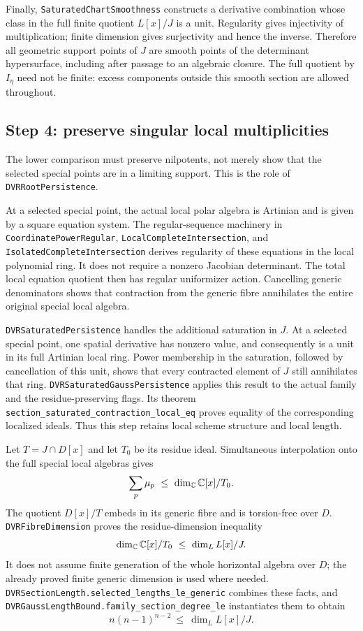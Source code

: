 Finally, \nolinkurl{SaturatedChartSmoothness} constructs a derivative
combination whose class in the full finite quotient $L[x]/J$ is a unit.
Regularity gives injectivity of multiplication; finite dimension gives
surjectivity and hence the inverse.  Therefore all geometric support
points of $J$ are smooth points of the determinant hypersurface, including
after passage to an algebraic closure.  The full quotient by $I_\eta$
need not be finite: excess components outside this smooth section are
allowed throughout.

\subsection{Step 4: preserve singular local multiplicities}
\label{app:lean-persistence}

The lower comparison must preserve nilpotents, not merely show that the
selected special points are in a limiting support.  This is the role of
\nolinkurl{DVRRootPersistence}.

At a selected special point, the actual local polar algebra is Artinian
and is given by a square equation system.  The regular-sequence machinery
in \nolinkurl{CoordinatePowerRegular},
\nolinkurl{LocalCompleteIntersection}, and
\nolinkurl{IsolatedCompleteIntersection} derives regularity of these
equations in the local polynomial ring.  It does not require a nonzero
Jacobian determinant.  The total local equation quotient then has regular
uniformizer action.  Cancelling generic denominators shows that contraction
from the generic fibre annihilates the entire original special local
algebra.

\nolinkurl{DVRSaturatedPersistence} handles the additional saturation in
$J$.  At a selected special point, one spatial derivative has nonzero
value, and consequently is a unit in its full Artinian local ring.  Power
membership in the saturation, followed by cancellation of this unit, shows
that every contracted element of $J$ still annihilates that ring.
\nolinkurl{DVRSaturatedGaussPersistence} applies this result to the actual
family and the residue-preserving flags.  Its theorem
\nolinkurl{section_saturated_contraction_local_eq} proves equality of the
corresponding localized ideals.  Thus this step retains local scheme
structure and local length.

Let $T=J\cap D[x]$ and let $T_0$ be its residue ideal.  Simultaneous
interpolation onto the full special local algebras gives
\[
 \sum_p\mu_p\ \leq\ \dim_{\CC}\CC[x]/T_0.
\]
The quotient $D[x]/T$ embeds in its generic fibre and is torsion-free over
$D$.  \nolinkurl{DVRFibreDimension} proves the residue-dimension inequality
\[
 \dim_{\mathbb{C}}\mathbb{C}[x]/T_0\ \leq\ \dim_L L[x]/J.
\]
It does not assume finite generation of the whole horizontal algebra over
$D$; the already proved finite generic dimension is used where needed.
\nolinkurl{DVRSectionLength.selected_lengths_le_generic} combines these
facts, and \nolinkurl{DVRGaussLengthBound.family_section_degree_le}
instantiates them to obtain
\begin{equation}
 \label{eq:lean-special-generic}
 n(n-1)^{n-2}\ \leq\ \dim_L L[x]/J.
\end{equation}

